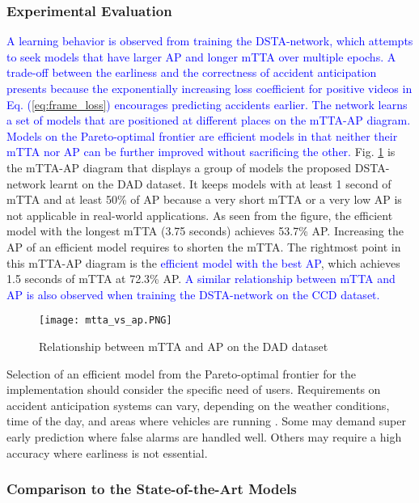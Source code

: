 \documentclass[journal]{IEEEtran}
\begin{document}
\subsubsection{Experimental Evaluation}
\label{sub:exp_evaluation}
\textcolor{blue}{A learning behavior is observed from training the DSTA-network, which attempts to seek models that have larger AP and longer mTTA over multiple epochs. A trade-off between the earliness and the correctness of accident anticipation presents because the exponentially increasing loss coefficient for positive videos in Eq. (\ref{eq:frame_loss}) encourages predicting accidents earlier. The network learns a set of models that are positioned at different places on the mTTA-AP diagram. Models on the Pareto-optimal frontier \cite{censor1977pareto} are efficient models in that neither their mTTA nor AP can be further improved without sacrificing the other.} Fig. \ref{fig_mtta_ap} is the mTTA-AP diagram that displays a group of models the proposed DSTA-network learnt on the DAD dataset. It keeps models with at least 1 second of mTTA and at least 50\% of AP because a very short mTTA or a very low AP is not applicable in real-world applications. As seen from the figure, the efficient model with the longest mTTA (3.75 seconds) achieves 53.7\% AP.  Increasing the AP of an efficient model requires to shorten the mTTA. The rightmost point in this mTTA-AP diagram is the \textcolor{blue}{efficient model with the best AP}, which achieves 1.5 seconds of mTTA at 72.3\% AP. \textcolor{blue}{A similar relationship between mTTA and AP is also observed when training the DSTA-network on the CCD dataset.}

\begin{figure}[htbp]
\centering
\texttt{[image: mtta\_vs\_ap.PNG]}
\caption{Relationship between mTTA and AP on the DAD dataset}
\label{fig_mtta_ap}
\end{figure}


Selection of an efficient model from the Pareto-optimal frontier for the implementation should consider the specific need of users. Requirements on accident anticipation systems can vary, depending on the weather conditions, time of the day, and areas where vehicles are running \cite{li2021crash}. Some may demand super early prediction where false alarms are handled well. Others may require a high accuracy where earliness is not essential.


\subsubsection{Comparison to the State-of-the-Art Models}
\end{document}
